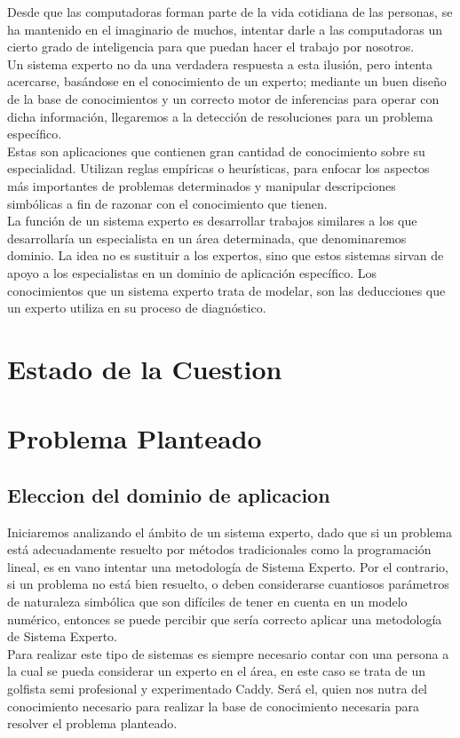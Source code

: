 \documentclass[runningheads,a4paper]{llncs}
\begin{document}
Desde que las computadoras forman parte de la vida cotidiana de las personas, se ha mantenido en el imaginario de muchos, intentar darle a las computadoras un cierto grado de inteligencia para que puedan hacer el trabajo por nosotros.\\
Un sistema experto no da una verdadera respuesta a esta ilusión, pero intenta acercarse, basándose en el conocimiento de un experto; mediante un buen diseño de la base de conocimientos y un correcto motor de inferencias para operar con dicha información, llegaremos a la detección de resoluciones para un problema específico.\\
Estas son aplicaciones que contienen gran cantidad de conocimiento sobre su especialidad. Utilizan reglas empíricas o heurísticas, para enfocar los aspectos más importantes de problemas determinados y manipular descripciones simbólicas a fin de razonar con el conocimiento que tienen.\cite{Samper} \\ 
La función de un sistema experto es desarrollar trabajos similares a los que desarrollaría un especialista en un área determinada, que denominaremos dominio. La idea no es sustituir a los expertos, sino que estos sistemas sirvan de apoyo a los especialistas en un dominio de aplicación específico.
Los conocimientos que un sistema experto trata de modelar, son las deducciones que un experto utiliza en su proceso de diagnóstico.\\

\section{Estado de la Cuestion}

\section{Problema Planteado}
\subsection{Eleccion del dominio de aplicacion}
Iniciaremos analizando el ámbito de un sistema experto, dado que si un problema está adecuadamente resuelto por métodos tradicionales como la programación lineal, es en vano intentar una metodología de Sistema Experto. Por el contrario, si un problema no está bien resuelto, o deben considerarse cuantiosos parámetros de naturaleza simbólica que son difíciles de tener en cuenta en un modelo numérico, entonces se puede percibir que sería correcto aplicar una metodología de Sistema Experto.\\
Para realizar este tipo de sistemas es siempre necesario contar con una persona a la cual se pueda considerar un experto en el área, en este caso se trata de un golfista semi profesional y experimentado Caddy. Será el, quien nos nutra del conocimiento necesario para realizar la base de conocimiento necesaria para resolver el problema planteado.\\
\end{document}
